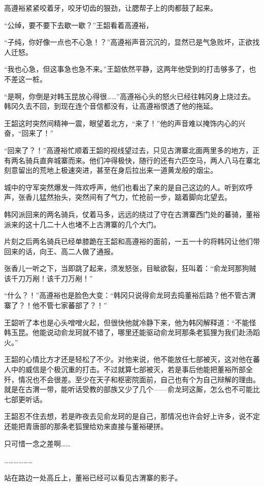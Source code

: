 高遵裕紧紧咬着牙，咬牙切齿的狠劲，让腮帮子上的肉都鼓了起来。

“公绰，要不要下去歇一歇？”王韶看着高遵裕，

“子纯，你好像一点也不心急！？”高遵裕声音沉沉的，显然已是气急败坏，正欲找人迁怒。

“我也心急，但这事急也急不来。”王韶依然平静，这两年他受到的打击够多了，也不差这一桩。

“是啊，你倒是对韩玉昆放心得很……”高遵裕心头的怒火已经往韩冈身上烧过去。韩冈久去不回，到现在连个音信都没有，让高遵裕恨透了他的拖延。

王韶这时突然间精神一震，眼望着北方，“来了！”他的声音难以掩饰内心的兴奋，“回来了！”

“回来了？！”高遵裕忙顺着王韶的视线望过去，只见古渭寨北面两里多的地方，正有两名骑兵直奔城寨而来。他们冲得极快，随行的还有六匹空马，两人八马在寨北刻意留出的荒地上极速突进，甚至在身后拉出来一道黄龙般的烟尘。

城中的守军突然爆发一阵欢呼声，他们也看出了来的是自己这边的人。听到欢呼声，张香儿猛然抬头，突然间有了气力，忙抢前一步，踮着脚向北望去。

韩冈派回来的两名骑兵，仗着马多，远远的绕过了守在古渭寨西门处的蕃骑，董裕派来的这十几二十人也堵不上古渭寨的几个大门。

片刻之后两名骑兵已经单膝跪在王韶和高遵裕的面前，一五一十的将韩冈让他们带回来的话，向王、高二人做了通报。

张香儿一听之下，当即跳了起来，须发怒张，目眦欲裂，狂叫着：“俞龙珂那狗贼该千刀万剐！该千刀万剐！”

“什么？！”高遵裕也是脸色大变：“韩冈只说得俞龙珂去捣董裕后路？他不管古渭寨了？！他不管七家蕃部了？！”

王韶听了本也是心头噌噌火起，但很快他就冷静下来，他为韩冈解释道：“不能怪韩玉昆。他能说动俞龙珂就不错了，哪里还能驱动俞龙珂那条老狐狸为我们赴汤蹈火。”

王韶的心情比方才还是轻松了不少。对他来说，他不能放任七部被灭，这对他在蕃人中的威信是个极沉重的打击。不过就算七部被灭，若是事后他能把董裕所部全歼，情况也不会很差。至少在天子和枢密院面前，自己也有个为自己辩解的理由。就是在古渭一带，能听话受教的部族又少了几个——俞龙珂这厮，怎么也不可能比七部更听话。

王韶忍不住去想，若是昨夜去见俞龙珂的是自己，那情况也许会好上许多，说不定还能把青唐部的那条老狐狸给劝来直接与董裕硬拼。

只可惜一念之差啊……

………………

站在路边一处高丘上，董裕已经可以看见古渭寨的影子。

